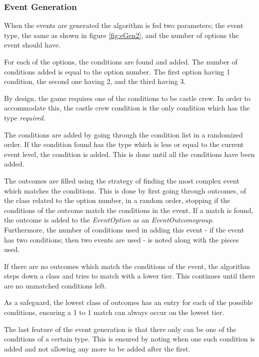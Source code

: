 \subsubsection{Event Generation}
When the events are generated the algorithm is fed two parameters;
the event type, the same as shown in figure \ref{fig:eGen2}, and the number of options the event should have.

For each of the options, the conditions are found and added. The number of conditions added is equal to the option number. The first option having 1 condition, the second one having 2, and the third having 3. 

By design, the game requires one of the conditions to be castle crew. In order to accommodate this, the castle crew condition is the only condition which has the type \textit{required}.

The conditions are added by going through the condition list in a randomized order. If the condition found has the type which is less or equal to the current event level, the condition is added. This is done until all the conditions have been added.

The outcomes are filled using the strategy of finding the most complex event which matches the conditions.
This is done by first going through outcomes, of the class related to the option number, in a random order, stopping if the conditions of the outcome match the conditions in the event. 
If a match is found, the outcome is added to the \textit{EventOption} as an \textit{EventOutcomegroup}. Furthermore, the number of conditions used in adding this event - if the event has two conditions; then two events are used - is noted along with the pieces used.

If there are no outcomes which match the conditions of the event, the algorithm steps down a class and tries to match with a lower tier. 
This continues until there are no unmatched conditions left.

As a safeguard, the lowest class of outcomes has an entry for each of the possible conditions, ensuring a 1 to 1 match can always occur on the lowest tier. 

The last feature of the event generation is that there only can be one of the conditions of a certain type. This is ensured by noting when one such condition is added and not allowing any more to be added after the first.

